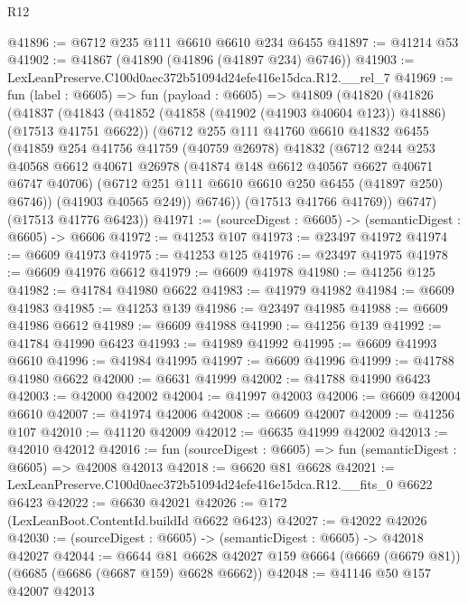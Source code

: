\begin{lexlean}{R12}
\begin{coremodule}
@41896 := @6712 @235 @111 @6610 @6610 @234 @6455
@41897 := @41214 @53
@41902 := @41867 (@41890 (@41896 (@41897 @234) @6746))
@41903 := LexLeanPreserve.C100d0aec372b51094d24efe416e15dca.R12.__rel_7
@41969 := fun (label : @6605) =>
  fun (payload : @6605) =>
  @41809
    (@41820
      (@41826
        (@41837
          (@41843
            (@41852 (@41858 (@41902 (@41903 @40604 @123)) @41886) (@17513 @41751 @6622))
            (@6712
              @255
              @111
              @41760
              @6610
              @41832
              @6455
              (@41859
                @254
                @41756
                @41759
                (@40759 @26978)
                @41832
                (@6712
                  @244
                  @253
                  @40568
                  @6612
                  @40671
                  @26978
                  (@41874 @148 @6612 @40567 @6627 @40671 @6747 @40706)
                  (@6712 @251 @111 @6610 @6610 @250 @6455 (@41897 @250) @6746))
                (@41903 @40565 @249))
              @6746))
          (@17513 @41766 @41769))
        @6747)
      (@17513 @41776 @6423))
@41971 := (sourceDigest : @6605) -> (semanticDigest : @6605) -> @6606
@41972 := @41253 @107
@41973 := @23497 @41972
@41974 := @6609 @41973
@41975 := @41253 @125
@41976 := @23497 @41975
@41978 := @6609 @41976 @6612
@41979 := @6609 @41978
@41980 := @41256 @125
@41982 := @41784 @41980 @6622
@41983 := @41979 @41982
@41984 := @6609 @41983
@41985 := @41253 @139
@41986 := @23497 @41985
@41988 := @6609 @41986 @6612
@41989 := @6609 @41988
@41990 := @41256 @139
@41992 := @41784 @41990 @6423
@41993 := @41989 @41992
@41995 := @6609 @41993 @6610
@41996 := @41984 @41995
@41997 := @6609 @41996
@41999 := @41788 @41980 @6622
@42000 := @6631 @41999
@42002 := @41788 @41990 @6423
@42003 := @42000 @42002
@42004 := @41997 @42003
@42006 := @6609 @42004 @6610
@42007 := @41974 @42006
@42008 := @6609 @42007
@42009 := @41256 @107
@42010 := @41120 @42009
@42012 := @6635 @41999 @42002
@42013 := @42010 @42012
@42016 := fun (sourceDigest : @6605) => fun (semanticDigest : @6605) => @42008 @42013
@42018 := @6620 @81 @6628
@42021 := LexLeanPreserve.C100d0aec372b51094d24efe416e15dca.R12.__fits_0 @6622 @6423
@42022 := @6630 @42021
@42026 := @172 (LexLeanBoot.ContentId.buildId @6622 @6423)
@42027 := @42022 @42026
@42030 := (sourceDigest : @6605) -> (semanticDigest : @6605) -> @42018 @42027
@42044 := @6644
    @81
    @6628
    @42027
    @159
    @6664
    (@6669 (@6679 @81))
    (@6685 (@6686 (@6687 @159) @6628 @6662))
@42048 := @41146 @50 @157 @42007 @42013

\end{coremodule}
\end{lexlean}
